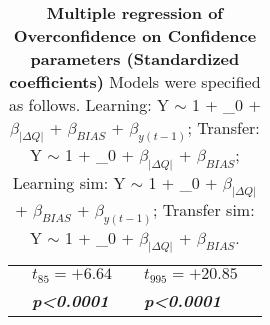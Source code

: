\begin{table}
\begin{tabular}{r|llll}
&$t_{85}=+6.64$&&$t_{995}=+20.85$&\\
&\textbf{\textit{p\textless0.0001}}&&\textbf{\textit{p\textless0.0001}}&\\
\hline \hline
\end{tabular}
\caption{\textbf{Multiple regression of Overconfidence on Confidence parameters (Standardized coefficients)} Models were specified as follows. Learning: Y $\sim$ 1 + \beta_0 + $\beta_{|\Delta Q|}$ + $\beta_{BIAS}$ + $\beta_{y(t-1)}$; Transfer: Y $\sim$ 1 + \beta_0 + $\beta_{|\Delta Q|}$ + $\beta_{BIAS}$; Learning sim: Y $\sim$ 1 + \beta_0 + $\beta_{|\Delta Q|}$ + $\beta_{BIAS}$ + $\beta_{y(t-1)}$; Transfer sim: Y $\sim$ 1 + \beta_0 + $\beta_{|\Delta Q|}$ + $\beta_{BIAS}$.}
\label{tab:Multiple regressionOverconfidence}
\end{table}

